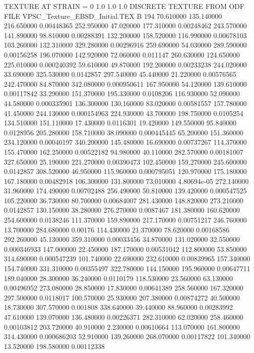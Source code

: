 TEXTURE AT STRAIN = 0
1.0   1.0   1.0
DISCRETE TEXTURE FROM ODF FILE VPSC_Texture\RD_EBSD_Initial.TEX
B 194
70.610000	135.140000	216.650000	0.00448365
252.950000	47.020000	177.310000	0.00248462
243.570000	141.890000	98.810000	0.00288391
132.200000	158.520000	116.990000	0.00678103
103.260000	132.310000	329.280000	0.00296916
259.690000	54.030000	289.590000	0.00156258
196.070000	142.920000	72.060000	0.011147
260.630000	124.650000	225.010000	0.000240392
59.610000	49.870000	192.200000	0.00233238
244.020000	33.690000	325.530000	0.0142857
297.540000	45.440000	21.220000	0.00576565
242.470000	84.870000	342.080000	0.000950611
167.950000	54.120000	139.610000	0.00117842
33.290000	151.370000	195.330000	0.0108206
116.930000	52.090000	44.580000	0.000335901
136.300000	130.160000	83.020000	0.00581557
157.780000	41.450000	244.130000	0.000154963
224.930000	43.700000	198.750000	0.0105254
134.510000	151.110000	17.430000	0.0116301
19.420000	149.550000	95.840000	0.0128956
205.280000	158.710000	38.090000	0.000445445
65.200000	151.360000	234.120000	0.00040197
340.200000	145.480000	16.690000	0.00737267
114.370000	155.470000	162.250000	0.00522182
94.980000	40.110000	282.570000	0.00181007
327.650000	25.190000	221.270000	0.00390473
102.450000	159.270000	245.600000	0.0142857
308.520000	46.950000	115.960000	0.000795051
120.970000	175.180000	167.180000	0.00482918
106.300000	131.800000	73.010000	4.80694e-05
272.140000	31.960000	174.490000	0.00702488
256.490000	50.810000	139.420000	0.000547525
105.220000	36.730000	80.700000	0.00684007
281.430000	148.820000	273.210000	0.0142857
130.150000	38.280000	276.270000	0.0087467
181.380000	160.620000	254.600000	0.0138246
111.370000	159.890000	217.170000	0.00751217
246.760000	13.700000	284.680000	0.00176
114.430000	21.370000	78.620000	0.00168586
292.260000	45.130000	359.310000	0.00033456
34.870000	131.020000	32.550000	0.000346933
147.000000	22.450000	187.170000	0.00531042
112.800000	53.850000	314.690000	0.000547239
101.740000	22.690000	232.610000	0.00839965
157.340000	154.740000	331.310000	0.00355497
322.780000	144.150000	195.960000	0.00647711
189.040000	28.300000	36.240000	0.0110179
118.530000	23.560000	63.130000	0.00496952
273.080000	28.850000	17.830000	0.00641389
258.560000	167.320000	297.500000	0.0118017
100.570000	25.930000	207.380000	0.00874272
40.500000	18.730000	307.570000	0.001808
338.640000	39.440000	88.960000	0.00283992
47.610000	139.070000	136.480000	0.00226371
282.310000	62.020000	258.460000	0.00103812
203.720000	40.910000	2.230000	0.00610664
113.070000	161.800000	314.430000	0.000686203
52.910000	139.260000	268.070000	0.00117822
101.340000	13.520000	198.580000	0.00112338
